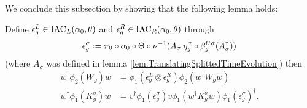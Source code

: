 \documentclass[11pt,a4paper,twoside]{article}
\numberwithin{equation}{section}
\begin{document}
	We conclude this subsection by showing that the following lemma holds:
	\begin{lemma}\label{lem:DefinitionOfEpsilons}
		Define $\epsilon^L_g\in\textrm{IAC}_L(\alpha_0,\theta)$ and $\epsilon^R_g\in\textrm{IAC}_R(\alpha_0,\theta)$ through
		\begin{align}
			\epsilon_g^\sigma\vcentcolon= \pi_0\circ\alpha_0\circ\Theta\circ\nu^{-1}(A_\sigma\:\eta_g^\sigma\circ\beta_{g}^{U\sigma}(A_\sigma^\dagger))
		\end{align}
		(where $A_\sigma$ was defined in lemma \ref{lem:TranslatingSplittedTimeEvolution}) then
		\begin{align}
			w^\dagger \phi_2(W_g)w &= \phi_1(\epsilon_g^L\otimes\epsilon_g^R)\phi_2(w^\dagger W_g w)\\
			\label{eq:TransformationOfKUnderEpsilon}
			w^\dagger \phi_1(K_g^\sigma)w&=v^\dagger\phi_1(\epsilon_g^\sigma)v\phi_1(w^\dagger K_g^\sigma w)\phi_1(\epsilon_g^\sigma)^\dagger.
		\end{align}
	\end{lemma}
\end{document}
